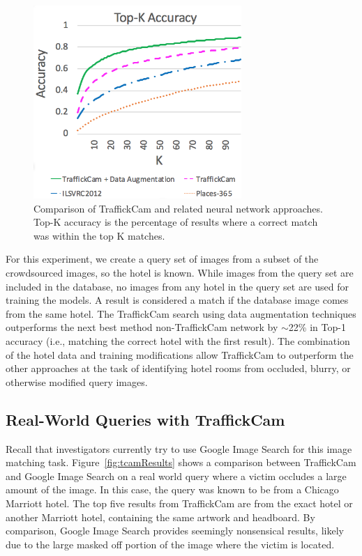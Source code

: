 \documentclass[12pt]{article}
\begin{document}
\begin{figure}
    \includegraphics[width=3.1in]{figs/top-k.png}
    \caption[Accuracy of current TraffickCam search]{Comparison of TraffickCam and related neural network approaches. Top-K accuracy is the percentage of results where a correct match was within the top K matches.}
    \label{fig:topKaccuracy}
\end{figure}
For this experiment, we create a query set of images from a subset of the crowdsourced images, so the hotel is known. While images from the query set are included in the database, no images from any hotel in the query set are used for training the models. A result is considered a match if the database image comes from the same hotel. The TraffickCam search using data augmentation techniques outperforms the next best method non-TraffickCam network by $\sim$22\% in Top-1 accuracy (i.e., matching the correct hotel with the first result). The combination of the hotel data and training modifications allow TraffickCam to outperform the other approaches at the task of identifying hotel rooms from occluded, blurry, or otherwise modified query images.

\subsection{Real-World Queries with TraffickCam}

Recall that investigators currently try to use Google Image Search for this image matching task. Figure~\ref{fig:tcamResults} shows a comparison between TraffickCam and Google Image Search on a real world query where a victim occludes a large amount of the image. In this case, the query was known to be from a Chicago Marriott hotel. The top five results from TraffickCam are from the exact hotel or another Marriott hotel, containing the same artwork and headboard. By comparison, Google Image Search provides seemingly nonsensical results, likely due to the large masked off portion of the image where the victim is located.
\end{document}
